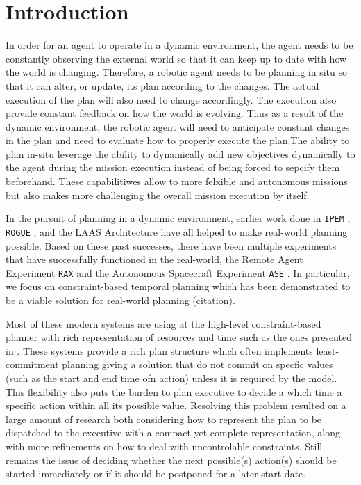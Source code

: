 \section{Introduction}
\label{sec:intro}



In order for an agent to operate in a dynamic environment, the agent
needs to be constantly observing the external world so that it can
keep up to date with how the world is changing. Therefore, a robotic
agent needs to be planning in situ so that it can alter, or update,
its plan according to the changes. The actual execution of the plan
will also need to change accordingly. The execution also provide
constant feedback on how the world is evolving.  Thus as a result of
the dynamic environment, the robotic agent will need to anticipate
constant changes in the plan and need to evaluate how to properly
execute the plan.The ability to plan in-situ leverage the ability to
dynamically add new objectives dynamically to the agent during the
mission execution instead of being forced to sepcify them beforehand.
These capabilitiwes allow to more felxible and autonomous missions
but also makes more challenging the overall mission execution by itself. 


In the pursuit of planning in a dynamic environment, earlier work done
in \texttt{IPEM} \cite{AmbrosIngerson88}, \texttt{ROGUE}
\cite{Haigh98}, and the LAAS Architecture \cite{alami:1998p820} have
all helped to make real-world planning possible. Based on these past
successes, there have been multiple experiments that have successfully
functioned in the real-world, the Remote Agent Experiment \texttt{RAX}
\cite{mus98} and the Autonomous Spacecraft Experiment \texttt{ASE}
\cite{chien99}. In particular, we focus on constraint-based temporal
planning which has been demonstrated to be a viable solution for
real-world planning (citation).

Most of these modern systems are using at the high-level 
constraint-based planner with rich representation of resources 
and time such as the ones presented in \cite{frank2003,lemai04}. 
These systems provide a rich plan structure which often implements
least-commitment planning giving a solution that do not commit on
specfic values (such as the start and end time ofn action) unless it
is required by the model. This flexibility also puts the burden to
plan executive to decide a which time a specific action within all
its possible value. Resolving this problem resulted on a large amount
of research both considering how to represent the plan to be
dispatched to the executive with a compact yet complete
representation, along with more refinements on how to deal with
uncontrolable constraints. Still, remains the issue of deciding 
whether the next possible(s) action(s) should be started immediately 
or if it should be postponed for a later start date. 


